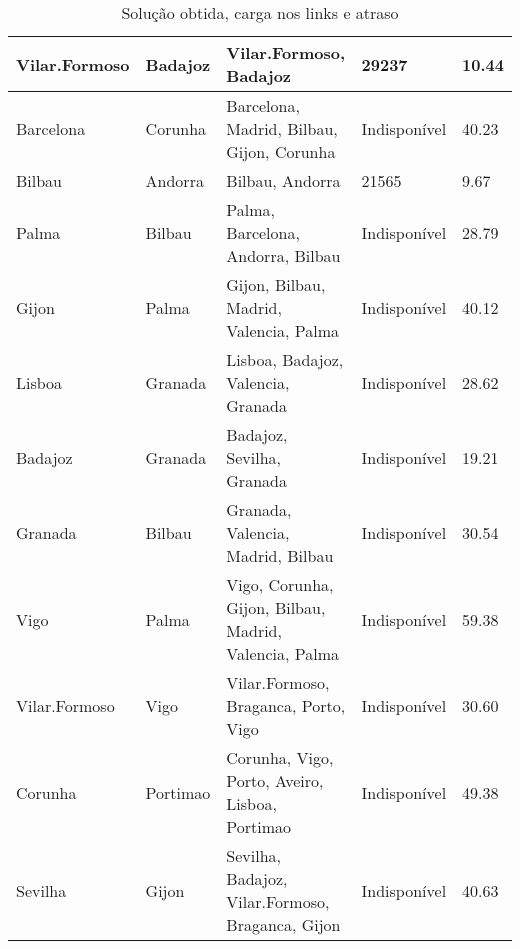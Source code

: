 \begin{table}[!htb]
{\begin{tabular}{|l|l|l|l|l|}
Vilar.Formoso & Badajoz & Vilar.Formoso, Badajoz & 29237 & 10.44 \\ \hline
Barcelona & Corunha & Barcelona, Madrid, Bilbau, Gijon, Corunha & Indisponível & 40.23 \\ \hline
Bilbau & Andorra & Bilbau, Andorra & 21565 & 9.67 \\ \hline
Palma & Bilbau & Palma, Barcelona, Andorra, Bilbau & Indisponível & 28.79 \\ \hline
Gijon & Palma & Gijon, Bilbau, Madrid, Valencia, Palma & Indisponível & 40.12 \\ \hline
Lisboa & Granada & Lisboa, Badajoz, Valencia, Granada & Indisponível & 28.62 \\ \hline
Badajoz & Granada & Badajoz, Sevilha, Granada & Indisponível & 19.21 \\ \hline
Granada & Bilbau & Granada, Valencia, Madrid, Bilbau & Indisponível & 30.54 \\ \hline
Vigo & Palma & Vigo, Corunha, Gijon, Bilbau, Madrid, Valencia, Palma & Indisponível & 59.38 \\ \hline
Vilar.Formoso & Vigo & Vilar.Formoso, Braganca, Porto, Vigo & Indisponível & 30.60 \\ \hline
Corunha & Portimao & Corunha, Vigo, Porto, Aveiro, Lisboa, Portimao & Indisponível & 49.38 \\ \hline
Sevilha & Gijon & Sevilha, Badajoz, Vilar.Formoso, Braganca, Gijon & Indisponível & 40.63 \\ \hline
\end{tabular}}
\caption[]{Solução obtida, carga nos links e atraso}
\end{table}

